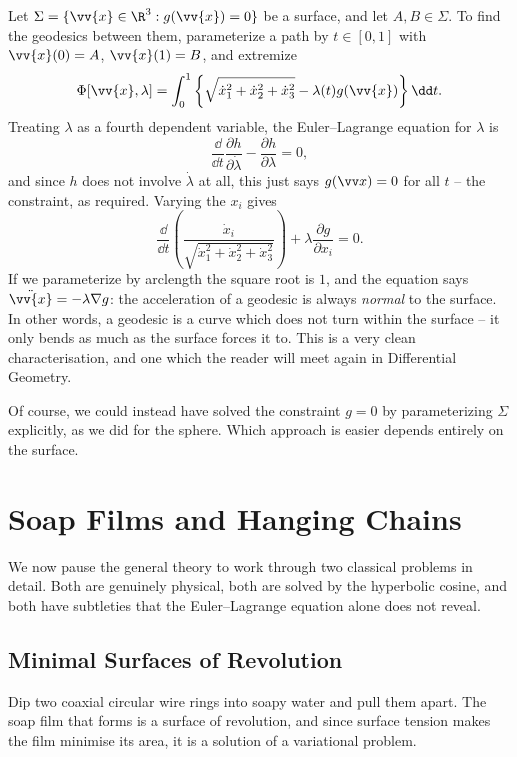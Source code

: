 \begin{example}
	Let $\Sigma = \{\vv{x} \in \R^3 : g(\vv{x}) = 0\}$ be a surface, and let $A, B \in \Sigma$. To find the geodesics between them, parameterize a path by $t \in [0,1]$ with $\vv{x}(0) = A$, $\vv{x}(1) = B$, and extremize
	$$
	\Phi[\vv{x}, \lambda] = \int_0^1\left\{\sqrt{\dot x_1^2 + \dot x_2^2 + \dot x_3^2} - \lambda(t)g(\vv{x})\right\}\dd t.
	$$
	Treating $\lambda$ as a fourth dependent variable, the Euler--Lagrange equation for $\lambda$ is
	$$
	\frac{\dd}{\dd t}\frac{\partial h}{\partial \dot\lambda} - \frac{\partial h}{\partial \lambda} = 0,
	$$
	and since $h$ does not involve $\dot \lambda$ at all, this just says $g(\vv x) = 0$ for all $t$ -- the constraint, as required. Varying the $x_i$ gives
	$$
	\frac{\dd}{\dd t}\left(\frac{\dot x_i}{\sqrt{\dot x_1^2 + \dot x_2^2 + \dot x_3^2}}\right) + \lambda \frac{\partial g}{\partial x_i} = 0.
	$$
	If we parameterize by arclength the square root is $1$, and the equation says $\ddot{\vv{x}} = -\lambda \nabla g$: the acceleration of a geodesic is always \emph{normal} to the surface. In other words, a geodesic is a curve which does not turn within the surface -- it only bends as much as the surface forces it to. This is a very clean characterisation, and one which the reader will meet again in Differential Geometry.

	Of course, we could instead have solved the constraint $g = 0$ by parameterizing $\Sigma$ explicitly, as we did for the sphere. Which approach is easier depends entirely on the surface.
\end{example}

\section{Soap Films and Hanging Chains}

We now pause the general theory to work through two classical problems in detail. Both are genuinely physical, both are solved by the hyperbolic cosine, and both have subtleties that the Euler--Lagrange equation alone does not reveal.

\subsection{Minimal Surfaces of Revolution}\label{sec:soap}

Dip two coaxial circular wire rings into soapy water and pull them apart. The soap film that forms is a surface of revolution, and since surface tension makes the film minimise its area, it is a solution of a variational problem.

